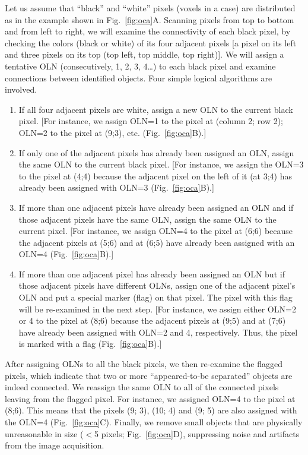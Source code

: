 Let us assume that ``black'' and ``white'' pixels (voxels in a \threed case) are distributed as in the example shown in Fig.~\ref{fig:oca}A. Scanning pixels from top to bottom and from left to right, we will examine the connectivity of each black pixel, by checking the colors (black or white) of its four adjacent pixels [a pixel on its left and three pixels on its top (top left, top middle, top right)]. We will assign a tentative \acf{OLN} (consecutively, 1, 2, 3, 4\ldots) to each black pixel and examine connections between identified objects. Four simple logical algorithms are involved.
\begin{enumerate}
	\item If all four adjacent pixels are white, assign a new \ac{OLN} to the current black pixel. [For instance, we assign \ac{OLN}=1 to the pixel at (column 2; row 2); \ac{OLN}=2 to the pixel at (9;3), etc. (Fig.~\ref{fig:oca}B).]
	\item If only one of the adjacent pixels has already been assigned an \ac{OLN}, assign the same \ac{OLN} to the current black pixel. [For instance, we assign the \ac{OLN}=3 to the pixel at (4;4) because the adjacent pixel on the left of it (at 3;4) has already been assigned with \ac{OLN}=3 (Fig.~\ref{fig:oca}B).]
	\item If more than one adjacent pixels have already been assigned an \ac{OLN} and if those adjacent pixels have the same \ac{OLN}, assign the same \ac{OLN} to the current pixel. [For instance, we assign \ac{OLN}=4 to the pixel at (6;6) because the adjacent pixels at (5;6) and at (6;5) have already been assigned with an \ac{OLN}=4 (Fig.~\ref{fig:oca}B).]
	\item If more than one adjacent pixel has already been assigned an \ac{OLN} but if those adjacent pixels have different OLNs, assign one of the adjacent pixel's \ac{OLN} and put a special marker (flag) on that pixel. The pixel with this flag will be re-examined in the next step. [For instance, we assign either \ac{OLN}=2 or 4 to the pixel at (8;6) because the adjacent pixels at (9;5) and at (7;6) have already been assigned with \ac{OLN}=2 and 4, respectively. Thus, the pixel is marked with a flag (Fig.~\ref{fig:oca}B).]
\end{enumerate}
After assigning OLNs to all the black pixels, we then re-examine the flagged pixels, which indicate that two or more ``appeared-to-be separated'' objects are indeed connected. We reassign the same \ac{OLN} to all of the connected pixels leaving from the flagged pixel. For instance, we assigned \ac{OLN}=4 to the pixel at (8;6). This means that the pixels (9; 3), (10; 4) and (9; 5) are also assigned with the \ac{OLN}=4 (Fig.~\ref{fig:oca}C). Finally, we remove small objects that are physically unreasonable in size ($<$5 pixels; Fig.~\ref{fig:oca}D), suppressing noise and artifacts from the image acquisition.


